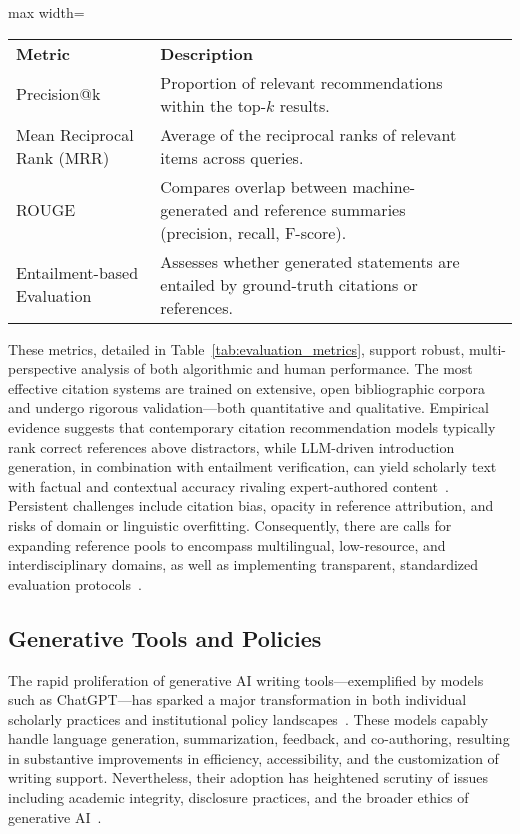 \begin{table*}[htbp]
\centering
\caption{Key Evaluation Metrics for Citation Recommendation and Scholarly Text Generation}
\label{tab:evaluation_metrics}
\begin{adjustbox}{max width=\textwidth}
\begin{tabular}{@{}llll@{}}
\toprule
\textbf{Metric} & \textbf{Description} & & \\
Precision@k & Proportion of relevant recommendations within the top-$k$ results. & & \\
Mean Reciprocal Rank (MRR) & Average of the reciprocal ranks of relevant items across queries. & & \\
ROUGE & Compares overlap between machine-generated and reference summaries (precision, recall, F-score). & & \\
Entailment-based Evaluation & Assesses whether generated statements are entailed by ground-truth citations or references. & & \\
\bottomrule
\end{tabular}
\end{adjustbox}
\end{table*}

These metrics, detailed in Table~\ref{tab:evaluation_metrics}, support robust, multi-perspective analysis of both algorithmic and human performance. The most effective citation systems are trained on extensive, open bibliographic corpora and undergo rigorous validation—both quantitative and qualitative. Empirical evidence suggests that contemporary citation recommendation models typically rank correct references above distractors, while LLM-driven introduction generation, in combination with entailment verification, can yield scholarly text with factual and contextual accuracy rivaling expert-authored content~\cite{ref107}. Persistent challenges include citation bias, opacity in reference attribution, and risks of domain or linguistic overfitting. Consequently, there are calls for expanding reference pools to encompass multilingual, low-resource, and interdisciplinary domains, as well as implementing transparent, standardized evaluation protocols~\cite{ref107}.

\subsection{Generative Tools and Policies}

The rapid proliferation of generative AI writing tools—exemplified by models such as ChatGPT—has sparked a major transformation in both individual scholarly practices and institutional policy landscapes~\cite{ref104,ref109,ref110}. These models capably handle language generation, summarization, feedback, and co-authoring, resulting in substantive improvements in efficiency, accessibility, and the customization of writing support. Nevertheless, their adoption has heightened scrutiny of issues including academic integrity, disclosure practices, and the broader ethics of generative AI~\cite{ref104,ref109}.

